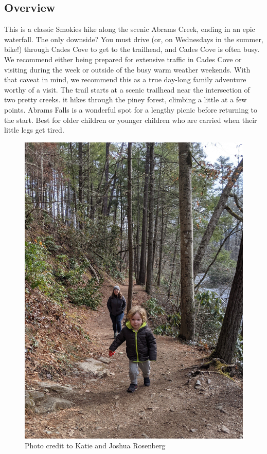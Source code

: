 \documentclass[
  letterpaper,
  DIV=11,
  numbers=noendperiod]{scrreprt}
\begin{document}
\subsection{Overview}\label{overview-28}

This is a classic Smokies hike along the scenic Abrams Creek, ending in
an epic waterfall. The only downside? You must drive (or, on Wednesdays
in the summer, bike!) through Cades Cove to get to the trailhead, and
Cades Cove is often busy. We recommend either being prepared for
extensive traffic in Cades Cove or visiting during the week or outside
of the busy warm weather weekends. With that caveat in mind, we
recommend this as a true day-long family adventure worthy of a visit.
The trail starts at a scenic trailhead near the intersection of two
pretty creeks. it hikes through the piney forest, climbing a little at a
few points. Abrams Falls is a wonderful spot for a lengthy picnic before
returning to the start. Best for older children or younger children who
are carried when their little legs get tired.

\begin{figure}[H]

{\centering \includegraphics[width=6.25in,height=\textheight,keepaspectratio]{img/trail-28-figure-01.jpg}

}

\caption{Photo credit to Katie and Joshua Rosenberg}

\end{figure}%
\end{document}
